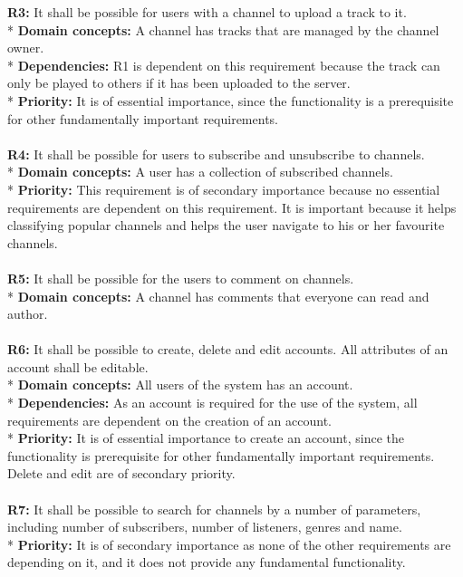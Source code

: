 \documentclass[a4paper,11pt,report]{article}
\begin{document}
\textbf{R3:}
It shall be possible for users with a channel to upload a track to it. \\*
\textbf{Domain concepts:}
A channel has tracks that are managed by the channel owner. \\*
\textbf{Dependencies:}
R1 is dependent on this requirement because the track can only be played to others if it has been uploaded to the server.\\*
\textbf{Priority:}
It is of essential importance, since the functionality is a prerequisite for other fundamentally important requirements.
\\ \\

\textbf{R4:}
It shall be possible for users to subscribe and unsubscribe to channels. \\*
\textbf{Domain concepts:}
A user has a collection of subscribed channels. \\*
\textbf{Priority:}
This requirement is of secondary importance because no essential requirements are dependent on this requirement. It is important because it helps classifying popular channels and helps the user navigate to his or her favourite channels.
\\ \\

\textbf{R5:}
It shall be possible for the users to comment on channels. \\*
\textbf{Domain concepts:}
A channel has comments that everyone can read and author.
\\ \\

\textbf{R6:}
It shall be possible to create, delete and edit accounts. All attributes of an account shall be editable. \\*
\textbf{Domain concepts:}
All users of the system has an account. \\*
\textbf{Dependencies:}
As an account is required for the use of the system, all requirements are dependent on the creation of an account. \\*
\textbf{Priority:} 
It is of essential importance to create an account, since the functionality is prerequisite for other fundamentally important requirements. Delete and edit are of secondary priority.
\\ \\

\textbf{R7:}
It shall be possible to search for channels by a number of parameters, including number of subscribers, number of listeners, genres and name. \\*
\textbf{Priority:} 
It is of secondary importance as none of the other requirements are depending on it, and it does not provide any fundamental functionality.
\end{document}
